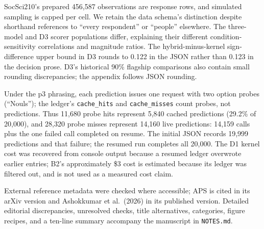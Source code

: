\documentclass[11pt]{article}
\begin{document}
SocSci210's prepared 456,587 observations are response rows, and simulated sampling is capped per cell. We retain the data schema's distinction despite shorthand references to ``every respondent'' or ``people'' elsewhere. The three-model and D3 scorer populations differ, explaining their different condition-sensitivity correlations and magnitude ratios. The hybrid-minus-kernel sign-difference upper bound in D3 rounds to 0.122 in the JSON rather than 0.123 in the decision prose. D3's historical 90\% flagship comparisons also contain small rounding discrepancies; the appendix follows JSON rounding.

Under the p3 phrasing, each prediction issues one request with two option probes (``Nouls''); the ledger's \texttt{cache\_hits} and \texttt{cache\_misses} count probes, not predictions. Thus 11,680 probe hits represent 5,840 cached predictions (29.2\% of 20,000), and 28,320 probe misses represent 14,160 live predictions: 14,159 calls plus the one failed call completed on resume. The initial JSON records 19,999 predictions and that failure; the resumed run completes all 20,000. The D1 kernel cost was recovered from console output because a resumed ledger overwrote earlier entries; B2's approximately \$3 cost is estimated because its ledger was filtered out, and is not used as a measured cost claim.

External reference metadata were checked where accessible; APS is cited in its arXiv version and Ashokkumar et al.\ (2026) in its published version. Detailed editorial discrepancies, unresolved checks, title alternatives, categories, figure recipes, and a ten-line summary accompany the manuscript in \texttt{NOTES.md}.

\clearpage


\end{document}
